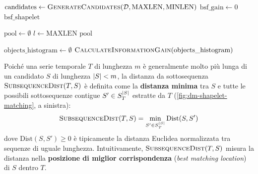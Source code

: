 \begin{algorithm}[H]
\caption{\textsc{FindingShapeletBF}: Ricerca esaustiva dello shapelet ottimale}
\label{alg:dm-finding-shapelet-bf}
$\text{candidates} \leftarrow \textsc{GenerateCandidates}(\mathcal{D}, \text{MAXLEN}, \text{MINLEN})$\;
$\text{bsf\_gain} \leftarrow 0$\;
\Return $\text{bsf\_shapelet}$\;
\end{algorithm}

\begin{algorithm}[H]
\caption{\textsc{GenerateCandidates}: Estrazione delle sottosequenze candidate}
\label{alg:dm-gen-candidates}
$\text{pool} \leftarrow \emptyset$\;
$l \leftarrow \text{MAXLEN}$\;
\Return $\text{pool}$\;
\end{algorithm}

\begin{algorithm}[H]
\caption{\textsc{CheckCandidate}: Valutazione di un candidato tramite istogramma delle distanze}
\label{alg:dm-check-candidate}
$\text{objects\_histogram} \leftarrow \emptyset$\;
\Return $\textsc{CalculateInformationGain}(\text{objects\_histogram})$\;
\end{algorithm}

Poich\'e una serie temporale $T$ di lunghezza $m$ \`e generalmente molto pi\`u lunga di un candidato $S$ di lunghezza $\left|S\right| < m$, la distanza da sottosequenza $\textsc{SubsequenceDist}(T, S)$ \`e definita come la \textbf{distanza minima} tra $S$ e tutte le possibili sottosequenze contigue $S' \in S_T^{\left|S\right|}$ estratte da $T$ (\autoref{fig:dm-shapelet-matching}, a sinistra):
\begin{equation}
    \textsc{SubsequenceDist}(T, S) = \min_{S' \in S_T^{\left|S\right|}} \text{Dist}(S, S')
\end{equation}
dove $\text{Dist}(S, S') \ge 0$ \`e tipicamente la distanza Euclidea normalizzata tra sequenze di uguale lunghezza. Intuitivamente, $\textsc{SubsequenceDist}(T, S)$ misura la distanza nella \textbf{posizione di miglior corrispondenza} (\textit{best matching location}) di $S$ dentro $T$.


